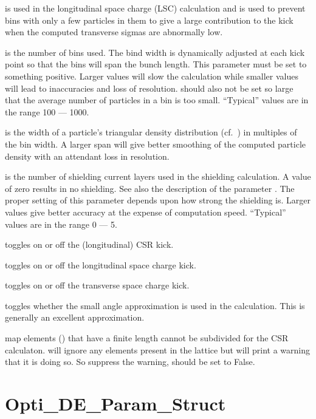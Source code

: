 {{{{{{{{{ is used in the longitudinal space charge (LSC)
calculation and is used to prevent bins with only a few particles in
them to give a large contribution to the kick when the computed
transverse sigmas are abnormally low.

 is the number of bins used. The bind width is dynamically
adjusted at each kick point so that the bins will span the bunch
length.  This parameter must be set to something positive. Larger
values will slow the calculation while smaller values will lead to
inaccuracies and loss of resolution.  should also not be set
so large that the average number of particles in a bin is too small. 
``Typical'' values are in the range 100 --- 1000.

 is the width of a particle's triangular density
distribution (cf.~) in multiples of the bin width. A
larger span will give better smoothing of the computed particle
density with an attendant loss in resolution.

 is the number of shielding current layers used in
the shielding calculation. A value of zero results in no
shielding. See also the description of the parameter
. The proper setting of this parameter depends
upon how strong the shielding is. Larger values give better accuracy
at the expense of computation speed. ``Typical'' values are in the
range 0 --- 5.

 toggles on or off the (longitudinal) CSR kick.

 toggles on or off the longitudinal space charge
kick. 

 toggles on or off the transverse space charge
kick. 

 toggles whether the small angle approximation
is used in the calculation. This is generally an excellent
approximation.

 map elements () that have a finite length
cannot be subdivided for the CSR calculaton. \bmad will ignore any
 elements present in the lattice but will print a warning
that it is doing so. So suppress the warning, 
should be set to False.

\section{Opti_DE_Param_Struct}
\label{s:de.params}

}}}}}}}}}
